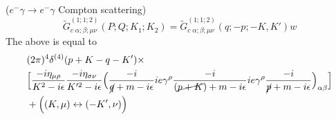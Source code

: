 \vspace{2ex}
\begin{ex}
($e^{-}\gamma \rightarrow e^{-}\gamma $ Compton scattering)
\[\tilde{G}_{c\;\alpha;\beta;\mu \nu }^{(1;1;2)}(P;Q;K_1;K_2)=\tilde{G}^{(1;1;2)}_{c\;\alpha;\beta;\mu \nu }(q;-p;-K,K')w\]
The above is equal to
\[\begin{align*}
&(2\pi )^{4}\delta ^{(4)}(p+K-q-K')\times \\&\Big[\dfrac{-i\eta _{\mu \rho }}{K^2-i\epsilon }\dfrac{-i\eta _{\sigma \nu }}{K'^2-i\epsilon }\Big(\dfrac{-i}{\cancel{q}+m-i\epsilon }ie\gamma ^{\rho }\dfrac{-i}{(\cancel{p+K})+m-i\epsilon }ie\gamma ^{\rho }\dfrac{-i}{\cancel{p}+m-i\epsilon }\Big)_{\alpha \beta }\Big]\\
&+\Big((K,\mu )\leftrightarrow (-K',\nu )\Big)
\end{align*}\]

\end{ex}
\vspace{2ex}

